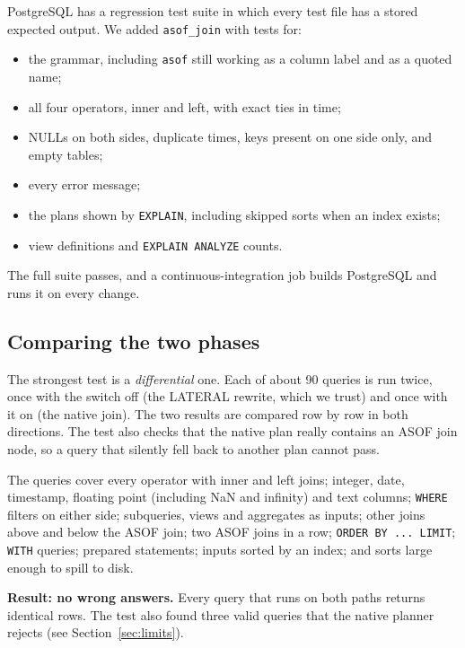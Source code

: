 \documentclass[11pt,a4paper]{article}
\newcommand{\code}[1]{\texttt{#1}}
\begin{document}
PostgreSQL has a regression test suite in which every test file has a stored expected
output. We added \code{asof\_join} with tests for:

\begin{itemize}
  \item the grammar, including \code{asof} still working as a column label and as a
        quoted name;
  \item all four operators, inner and left, with exact ties in time;
  \item NULLs on both sides, duplicate times, keys present on one side only, and empty
        tables;
  \item every error message;
  \item the plans shown by \code{EXPLAIN}, including skipped sorts when an index exists;
  \item view definitions and \code{EXPLAIN ANALYZE} counts.
\end{itemize}

The full suite passes, and a continuous-integration job builds PostgreSQL and runs it on
every change.

\subsection{Comparing the two phases}

The strongest test is a \emph{differential} one. Each of about 90 queries is run twice,
once with the switch off (the LATERAL rewrite, which we trust) and once with it on (the
native join). The two results are compared row by row in both directions. The test also
checks that the native plan really contains an ASOF join node, so a query that silently
fell back to another plan cannot pass.

The queries cover every operator with inner and left joins; integer, date, timestamp,
floating point (including NaN and infinity) and text columns; \code{WHERE} filters on
either side; subqueries, views and aggregates as inputs; other joins above and below the
ASOF join; two ASOF joins in a row; \code{ORDER BY ... LIMIT}; \code{WITH} queries;
prepared statements; inputs sorted by an index; and sorts large enough to spill to disk.

\textbf{Result: no wrong answers.} Every query that runs on both paths returns identical
rows. The test also found three valid queries that the native planner rejects (see
Section~\ref{sec:limits}).

\end{document}

